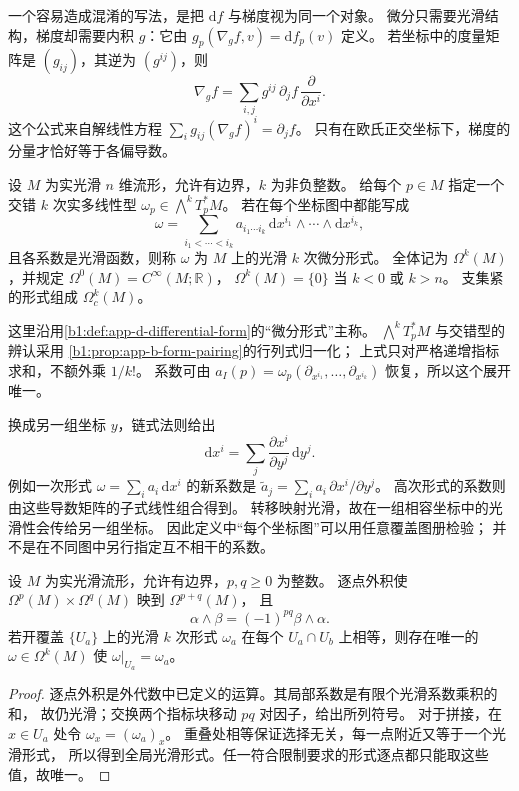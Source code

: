 \ProseParagraphBreak

一个容易造成混淆的写法，是把 \(\mathrm df\) 与梯度视为同一个对象。
微分只需要光滑结构，梯度却需要内积 \(g\)：它由
\(g_p(\nabla_g f,v)=\mathrm df_p(v)\) 定义。
若坐标中的度量矩阵是 \((g_{ij})\)，其逆为 \((g^{ij})\)，则
\[
 \nabla_g f=\sum_{i,j}g^{ij}\,\partial_j f\,
                   \frac{\partial}{\partial x^i}.
\]
这个公式来自解线性方程
\(\sum_i g_{ij}(\nabla_g f)^i=\partial_jf\)。
只有在欧氏正交坐标下，梯度的分量才恰好等于各偏导数。

\begin{definition}\label{b1:def:E-differential-form}
设 \(M\) 为实光滑 \(n\) 维流形，允许有边界，\(k\) 为非负整数。
给每个 \(p\in M\) 指定一个交错 \(k\) 次实多线性型
\(\omega_p\in\bigwedge^kT_p^*M\)。
若在每个坐标图中都能写成
\[
 \omega=\sum_{i_1<\cdots<i_k}
       a_{i_1\cdots i_k}\,
       \mathrm dx^{i_1}\wedge\cdots\wedge\mathrm dx^{i_k},
\]
且各系数是光滑函数，则称 \(\omega\) 为 \(M\) 上的光滑 \(k\) 次微分形式。
全体记为 \(\Omega^k(M)\)，并规定
\(\Omega^0(M)=C^\infty(M;\mathbb R)\)，
\(\Omega^k(M)=\{0\}\) 当 \(k<0\) 或 \(k>n\)。
支集紧的形式组成 \(\Omega_c^k(M)\)。
\end{definition}

这里沿用\cref{b1:def:app-d-differential-form}的“微分形式”主称。
\(\bigwedge^kT_p^*M\) 与交错型的辨认采用
\cref{b1:prop:app-b-form-pairing}的行列式归一化；
上式只对严格递增指标求和，不额外乘 \(1/k!\)。
系数可由
\(a_I(p)=\omega_p(\partial_{x^{i_1}},\ldots,\partial_{x^{i_k}})\)
恢复，所以这个展开唯一。

\ProseParagraphBreak

换成另一组坐标 \(y\)，链式法则给出
\[
 \mathrm dx^i=\sum_j\frac{\partial x^i}{\partial y^j}\,\mathrm dy^j.
\]
例如一次形式 \(\omega=\sum_i a_i\,\mathrm dx^i\) 的新系数是
\(\widetilde a_j=\sum_i a_i\,\partial x^i/\partial y^j\)。
高次形式的系数则由这些导数矩阵的子式线性组合得到。
转移映射光滑，故在一组相容坐标中的光滑性会传给另一组坐标。
因此定义中“每个坐标图”可以用任意覆盖图册检验；
并不是在不同图中另行指定互不相干的系数。

\begin{proposition}[形式的外积与局部拼接]\label{b1:prop:E-form-algebra}
设 \(M\) 为实光滑流形，允许有边界，\(p,q\geq0\) 为整数。
逐点外积使
\(\Omega^p(M)\times\Omega^q(M)\) 映到 \(\Omega^{p+q}(M)\)，
且
\[
 \alpha\wedge\beta=(-1)^{pq}\beta\wedge\alpha.
\]
若开覆盖 \(\{U_a\}\) 上的光滑 \(k\) 次形式 \(\omega_a\)
在每个 \(U_a\cap U_b\) 上相等，则存在唯一的
\(\omega\in\Omega^k(M)\) 使 \(\omega|_{U_a}=\omega_a\)。
\end{proposition}
\begin{proof}
逐点外积是外代数中已定义的运算。其局部系数是有限个光滑系数乘积的和，
故仍光滑；交换两个指标块移动 \(pq\) 对因子，给出所列符号。
对于拼接，在 \(x\in U_a\) 处令 \(\omega_x=(\omega_a)_x\)。
重叠处相等保证选择无关，每一点附近又等于一个光滑形式，
所以得到全局光滑形式。任一符合限制要求的形式逐点都只能取这些值，故唯一。
\end{proof}

